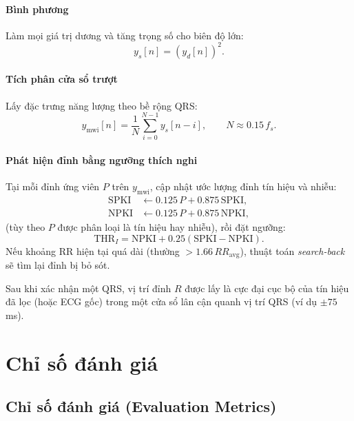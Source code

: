 \paragraph{Bình phương}

Làm mọi giá trị dương và tăng trọng số cho biên độ lớn:
\begin{equation}
  y_s[n] = \left(y_d[n]\right)^2.
\end{equation}

\paragraph{Tích phân cửa sổ trượt}

Lấy đặc trưng năng lượng theo bề rộng QRS:
\begin{equation}
  y_{\mathrm{mwi}}[n] = \frac{1}{N}\sum_{i=0}^{N-1} y_s[n-i], \qquad N \approx 0.15\,f_s.
\end{equation}

\paragraph{Phát hiện đỉnh bằng ngưỡng thích nghi}

Tại mỗi đỉnh ứng viên $P$ trên $y_{\mathrm{mwi}}$, cập nhật ước lượng đỉnh tín hiệu và nhiễu:
\begin{align}
  \mathrm{SPKI} &\leftarrow 0.125\,P + 0.875\,\mathrm{SPKI},\\
  \mathrm{NPKI} &\leftarrow 0.125\,P + 0.875\,\mathrm{NPKI},
\end{align}
(tùy theo $P$ được phân loại là tín hiệu hay nhiễu), rồi đặt ngưỡng:
\begin{equation}
  \mathrm{THR}_I = \mathrm{NPKI} + 0.25\left(\mathrm{SPKI}-\mathrm{NPKI}\right).
\end{equation}
Nếu khoảng RR hiện tại quá dài (thường $>1.66\,RR_{\mathrm{avg}}$), thuật toán \textit{search-back} sẽ tìm lại đỉnh bị bỏ sót.

Sau khi xác nhận một QRS, vị trí đỉnh $R$ được lấy là cực đại cục bộ của tín hiệu đã lọc (hoặc ECG gốc) trong một cửa sổ lân cận quanh vị trí QRS (ví dụ $\pm 75$ ms).






\section{Chỉ số đánh giá}
\subsection{Chỉ số đánh giá (Evaluation Metrics)}

